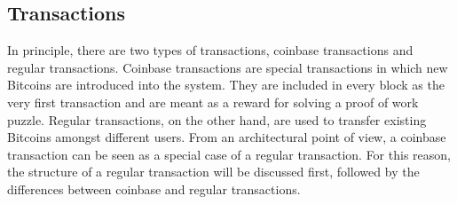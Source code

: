 \clearpage
\subsection{Transactions} \label{sec:Transactions}
In principle, there are two types of transactions, coinbase transactions and regular transactions. Coinbase transactions are special transactions in which new Bitcoins are introduced into the system. They are included in every block as the very first transaction and are meant as a reward for solving a proof of work puzzle. Regular transactions, on the other hand, are used to transfer existing Bitcoins amongst different users. From an architectural point of view, a coinbase transaction can be seen as a special case of a regular transaction. For this reason, the structure of a regular transaction will be discussed first, followed by the differences between coinbase and regular transactions.

\enlargethispage{2\baselineskip}

